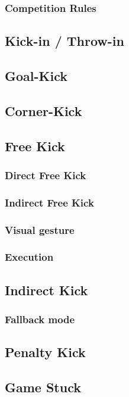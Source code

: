 \subsubsection{Competition Rules}

\subsection{Kick-in / Throw-in}

\subsection{Goal-Kick}

\subsection{Corner-Kick}

\subsection{Free Kick}
\subsubsection{Direct Free Kick}
\subsubsection{Indirect Free Kick}
\subsubsection{Visual gesture}
\subsubsection{Execution}

\subsection{Indirect Kick}
\subsubsection{Fallback mode}

\subsection{Penalty Kick}

\subsection{Game Stuck}
